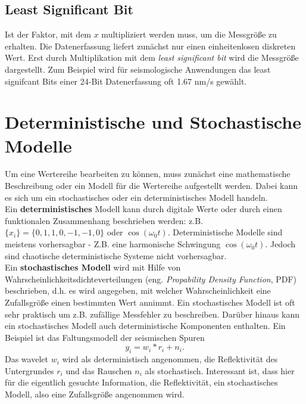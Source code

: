 \subsection{Least Significant Bit}
Ist der Faktor, mit dem $x$ multipliziert werden muss, um die Messgröße zu erhalten. Die Datenerfassung liefert zunächst nur einen einheitenlosen diskreten Wert. Erst durch Multiplikation mit dem \textsl{least significant bit} wird die Messgröße dargestellt. Zum Beispiel wird für seismologische Anwendungen das least signifcant Bits einer 24-Bit Datenerfassung oft 1.67 nm/s gewählt. 


\section{Deterministische und Stochastische Modelle}
Um eine Wertereihe bearbeiten zu können, muss zunächst eine mathematische Beschreibung oder ein Modell für die Wertereihe aufgestellt werden. Dabei kann es sich um ein stochastisches oder ein deterministisches Modell handeln.\\

Ein {\bf deterministisches} Modell kann durch digitale Werte oder durch einen funktionalen Zusammenhang beschrieben werden: z.B. $\{x_i\} = \{0,1,1,0,-1,-1,0\}$ oder $\cos(\omega_0t)$. Deterministische Modelle sind meistens vorhersagbar - Z.B. eine harmonische Schwingung $\cos(\omega_0t)$. Jedoch sind chaotische deterministische Systeme nicht vorhersagbar.\\


Ein \textbf{stochastisches Modell} wird mit Hilfe von Wahrscheinlichkeitsdichteverteilungen (eng. \textsl{Propability Density Function}, PDF) beschrieben, d.h. es wird angegeben, mit welcher Wahrscheinlichkeit eine Zufallsgröße einen bestimmten Wert annimmt. Ein stochastisches Modell ist oft sehr praktisch um z.B. zufällige Messfehler zu beschreiben. Darüber hinaus kann ein stochastisches Modell auch deterministische Komponenten enthalten. Ein Beispiel ist das Faltungsmodell der seismischen Spuren \[y_i = w_i * r_i + n_i.\]
Das wavelet $w_i$ wird als deterministisch angenommen, die Reflektivität des Untergrundes $r_i$ und das Rauschen $n_i$ als stochastisch. Interessant ist, dass hier für die eigentlich gesuchte Information, die Reflektivität, ein stochastisches Modell, also eine Zufallsgröße angenommen wird.\\

